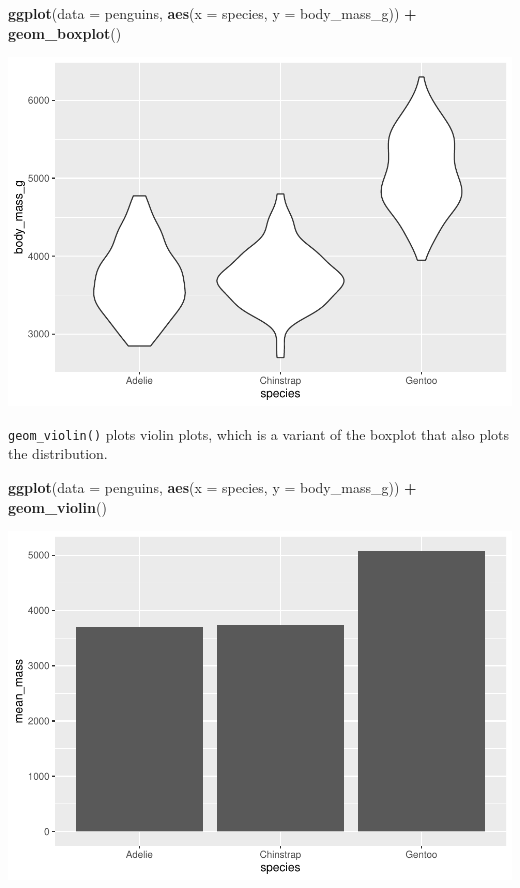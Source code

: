 \documentclass[
]{book}
\newenvironment{Shaded}{\begin{snugshade}}{\end{snugshade}}
\newcommand{\AttributeTok}[1]{\textcolor[rgb]{0.13,0.29,0.53}{#1}}
\newcommand{\FunctionTok}[1]{\textcolor[rgb]{0.13,0.29,0.53}{\textbf{#1}}}
\newcommand{\NormalTok}[1]{#1}
\newcommand{\SpecialCharTok}[1]{\textcolor[rgb]{0.81,0.36,0.00}{\textbf{#1}}}
\begin{document}
\begin{Shaded}
\begin{Highlighting}[]
\FunctionTok{ggplot}\NormalTok{(}\AttributeTok{data =}\NormalTok{ penguins, }\FunctionTok{aes}\NormalTok{(}\AttributeTok{x =}\NormalTok{ species, }\AttributeTok{y =}\NormalTok{ body\_mass\_g)) }\SpecialCharTok{+} 
  \FunctionTok{geom\_boxplot}\NormalTok{()}
\end{Highlighting}
\end{Shaded}

\includegraphics{_main_files/figure-latex/unnamed-chunk-55-1.pdf}

\texttt{geom\_violin()} plots violin plots, which is a variant of the boxplot that also plots the distribution.

\begin{Shaded}
\begin{Highlighting}[]
\FunctionTok{ggplot}\NormalTok{(}\AttributeTok{data =}\NormalTok{ penguins, }\FunctionTok{aes}\NormalTok{(}\AttributeTok{x =}\NormalTok{ species, }\AttributeTok{y =}\NormalTok{ body\_mass\_g)) }\SpecialCharTok{+} 
  \FunctionTok{geom\_violin}\NormalTok{()}
\end{Highlighting}
\end{Shaded}

\includegraphics{_main_files/figure-latex/unnamed-chunk-56-1.pdf}
\end{document}
